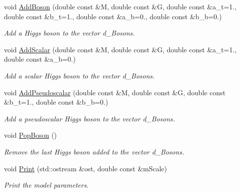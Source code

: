 \begin{DoxyCompactItemize}
\item 
void \hyperlink{classHiggsModel_acd87bf9a85c37da737aba62a0dc82b5b}{Add\-Boson} (double const \&M, double const \&G, double const \&a\-\_\-t=1., double const \&b\-\_\-t=1., double const \&a\-\_\-b=0., double const \&b\-\_\-b=0.)
\begin{DoxyCompactList}\small\item\em Add a Higgs boson to the vector d\-\_\-\-Bosons. \end{DoxyCompactList}\item 
void \hyperlink{classHiggsModel_ab84c9016bf5a8bd87f82f214c34cce8b}{Add\-Scalar} (double const \&M, double const \&G, double const \&a\-\_\-t=1., double const \&a\-\_\-b=0.)
\begin{DoxyCompactList}\small\item\em Add a scalar Higgs boson to the vector d\-\_\-\-Bosons. \end{DoxyCompactList}\item 
void \hyperlink{classHiggsModel_a94f5b60024363838e73e0e1b8d1604ca}{Add\-Pseudoscalar} (double const \&M, double const \&G, double const \&b\-\_\-t=1., double const \&b\-\_\-b=0.)
\begin{DoxyCompactList}\small\item\em Add a pseudoscalar Higgs boson to the vector d\-\_\-\-Bosons. \end{DoxyCompactList}\item 
\hypertarget{classHiggsModel_a7aea18c2e6622159e8f6cc29be537c0f}{void \hyperlink{classHiggsModel_a7aea18c2e6622159e8f6cc29be537c0f}{Pop\-Boson} ()}\label{classHiggsModel_a7aea18c2e6622159e8f6cc29be537c0f}

\begin{DoxyCompactList}\small\item\em Remove the last Higgs boson added to the vector d\-\_\-\-Bosons. \end{DoxyCompactList}\item 
void \hyperlink{classHiggsModel_aabc29ed3da5d400799c3de3edca3e228}{Print} (std\-::ostream \&ost, double const \&m\-Scale)
\begin{DoxyCompactList}\small\item\em Print the model parameters. \end{DoxyCompactList}\end{DoxyCompactItemize}


